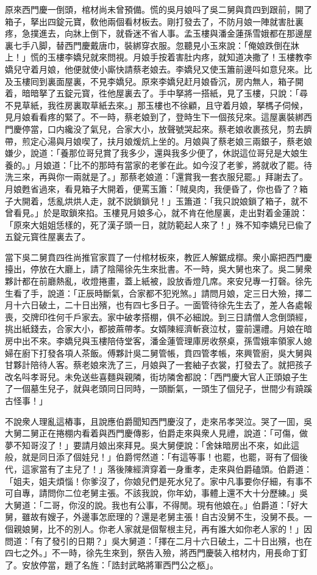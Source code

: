 原來西門慶一倒頭，棺材尚未曾預備。慌的吳月娘呌了吳二舅與賁四到跟前，開了箱子，拏出四錠元寶，敎他兩個看材板去。剛打發去了，不防月娘一陣就害肚裏疼，急撲進去，向牀上倒下，就昏迷不省人事。孟玉樓與潘金蓮孫雪娥都在那邊屋裏七手八脚，替西門慶戴唐巾，裝綁穿衣服。忽聽見小玉來說：「俺娘跌倒在牀上！」慌的玉樓李嬌兒就來問視。月娘手按着害肚内疼，就知道决撒了！玉樓教李嬌兒守着月娘，他便就使小廝快請蔡老娘去。李嬌兒又使玉簫前邊呌如意兒來。比及玉樓囘到裏面屋裏，不見李嬌兒。原來李嬌兒赶月娘昏沉，房内無人，箱子開着，暗暗拏了五錠元寳，徃他屋裏去了。手中拏將一搭紙，見了玉樓，只說：「尋不見草紙，我徃房裏取草紙去來。」那玉樓也不徐顧，且守着月娘，拏榪子伺候，見月娘看看疼的緊了。不一時，蔡老娘到了，登時生下一個孩兒來。這屋裏裝綁西門慶停當，口内纔没了氣兒，合家大小，放聲號哭起來。蔡老娘收裹孩兒，剪去臍帶，煎定心湯與月娘喫了，扶月娘煖炕上坐的。月娘與了蔡老娘三兩銀子，蔡老娘嫌少，說道：「養那位哥兒賞了我多少，還與我多少便了，休説這位哥兒是大娘生養的。」月娘道：「比不的那時有當家的老爹在此。如今沒了老爹，將就收了罷。待洗三來，再與你一兩就是了。」那蔡老娘道：「還賞我一套衣服兒罷。」拜謝去了。月娘甦省過來，看見箱子大開着，便罵玉簫：「賊臭肉，我便昏了，你也昏了？箱子大開着，恁亂烘烘人走，就不説鎖鎖兒！」玉簫道：「我只說娘鎖了箱子，就不曾看見。」於是取鎖來掐。玉樓見月娘多心，就不肯在他屋裏，走出對着金蓮說：「原來大姐姐恁樣的，死了漢子頭一日，就防範起人來了！」殊不知李嬌兒已偸了五錠元寳徃屋裏去了。

當下吳二舅賁四徃尚推官家買了一付棺材板來，教匠人解鋸成槨。衆小廝把西門慶擡出，停放在大廳上，請了陰陽徐先生來批書。不一時，吳大舅也來了。吳二舅衆夥計都在前廳熱亂，收燈捲畫，蓋上紙被，設放香燈几席。來安兒專一打磬。徐先生看了手，說道：「正辰時斷氣，合家都不犯兇煞。」請問月娘，定三日大殮，擇二月十六日破土，二十日出殯，也有四七多日子。一面管待徐先生去了，差人各處報喪，交牌印徃何千戶家去。家中破孝搭棚，俱不必細說。到三日請僧人念倒頭經，挑出紙錢去，合家大小，都披蔴帶孝。女婿陳經濟斬衰泣杖，靈前還禮。月娘在暗房中出不來。李嬌兒與玉樓陪侍堂客，潘金蓮管理庫房收祭桌，孫雪娥率領家人媳婦在廚下打發各項人茶飯。傅夥計吳二舅管帳，賁四管孝帳，來興管廚，吳大舅與甘夥計陪待人客。蔡老娘來洗了三，月娘與了一套紬子衣裳，打發去了。就把孩子改名呌孝哥兒。未免送些喜麵與親隣，街坊隣舍都說：「西門慶大官人正頭娘子生了一個墓生兒子，就與老頭同日同時，一頭斷氣，一頭生了個兒子，世間少有蹺蹊古怪事！」

不說衆人理亂這樁事，且說應伯爵聞知西門慶沒了，走來吊孝哭泣。哭了一囬，吳大舅二舅正在捲棚内看着與西門慶傳影，伯爵走來與衆人見禮，說道：「可傷，做夢不知哥沒了！」要請月娘出來拜見。吳大舅便說：「舍妹暗房出不來，如此這般，就是同日添了個娃兒！」伯爵愕然道：「有這等事！也罷，也罷，哥有了個後代，這家當有了主兒了！」落後陳經濟穿着一身重孝，走來與伯爵磕頭。伯爵道：「姐夫，姐夫煩惱！你爹沒了，你娘兒們是死水兒了。家中凡事要你仔細，有事不可自專，請問你二位老舅主張。不該我說，你年幼，事體上還不大十分歷練。」吳大舅道：「二哥，你沒的說。我也有公事，不得閒。現有他娘在。」伯爵道：「好大舅，雖故有嫂子，外邊事怎麽理的？還是老舅主張！自古没舅不生，没舅不長。一個親娘舅，比不的別人。你老人家就是個幚根主兒，再有誰大如你老人家的！」因問道：「有了發引的日期？」吳大舅道：「擇在二月十六日破土，二十日出殯，也在四七之外。」不一時，徐先生來到，祭告入殮，將西門慶裝入棺材内，用長命丁釘了。安放停當，題了名旌：「誥封武略將軍西門公之柩」。

